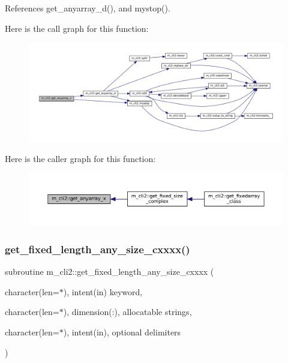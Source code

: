 References get\+\_\+anyarray\+\_\+d(), and mystop().

Here is the call graph for this function\+:
\nopagebreak
\begin{figure}[H]
\begin{center}
\leavevmode
\includegraphics[width=350pt]{namespacem__cli2_ab9ab288fa5f108beeb7c94d81b223b7c_cgraph}
\end{center}
\end{figure}
Here is the caller graph for this function\+:
\nopagebreak
\begin{figure}[H]
\begin{center}
\leavevmode
\includegraphics[width=350pt]{namespacem__cli2_ab9ab288fa5f108beeb7c94d81b223b7c_icgraph}
\end{center}
\end{figure}
\mbox{\label{namespacem__cli2_abc31389c45dcd95b8db641b59b98b447}} 
\subsubsection{\texorpdfstring{get\+\_\+fixed\+\_\+length\+\_\+any\+\_\+size\+\_\+cxxxx()}{get\_fixed\_length\_any\_size\_cxxxx()}}
{\footnotesize\ttfamily subroutine m\+\_\+cli2\+::get\+\_\+fixed\+\_\+length\+\_\+any\+\_\+size\+\_\+cxxxx (\begin{DoxyParamCaption}\item[{character(len=$\ast$), intent(in)}]{keyword,  }\item[{character(len=$\ast$), dimension(\+:), allocatable}]{strings,  }\item[{character(len=$\ast$), intent(in), optional}]{delimiters }\end{DoxyParamCaption})\hspace{0.3cm}{\ttfamily [private]}}



